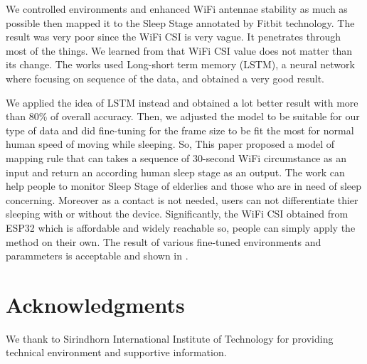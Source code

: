 \documentclass[10pt,letterpaper]{article}
\begin{document}
	We controlled environments and enhanced WiFi antennae stability as much as possible then mapped it to the Sleep Stage annotated by Fitbit technology. The result was very poor since the WiFi CSI is very vague. It penetrates through most of the things. We learned from \cite{bib20} that WiFi CSI value does not matter than its change. The works used Long-short term memory (LSTM), a neural network where focusing on sequence of the data, and obtained a very good result.  
	
	We applied the idea of LSTM instead and obtained a lot better result with more than 80\% of overall accuracy. Then, we adjusted the model to be suitable for our type of data and did fine-tuning for the frame size to be fit the most for normal human speed of moving while sleeping. So, This paper proposed a model of mapping rule that can takes a sequence of 30-second WiFi circumstance as an input and return an according human sleep stage as an output. The work can help people to monitor Sleep Stage of elderlies and those who are in need of sleep concerning. Moreover as a contact is not needed, users can not differentiate thier sleeping with or without the device. Significantly, the WiFi CSI obtained from ESP32 which is affordable and widely reachable so, people can simply apply the method on their own. The result of various fine-tuned environments and parammeters is acceptable and shown in .
	
	
	\section*{Acknowledgments}
	We thank to Sirindhorn International Institute of Technology for providing technical environment and supportive information.
	
	
	
	\nolinenumbers
	
\end{document}
